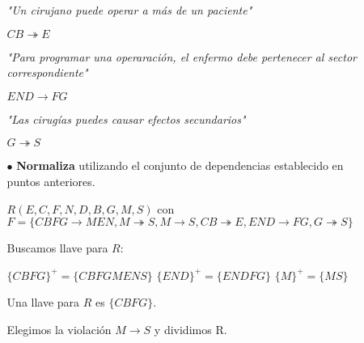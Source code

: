 \documentclass[12pt, letterpaper]{article}
\begin{document}
\begin{itemize}
\begin{itemize}
                                        \textit{"Un cirujano puede operar a más de un paciente"} \vspace{.2cm}

                                        $CB \twoheadrightarrow E$\vspace{.3cm}

                                        \textit{"Para programar una operaración, el enfermo debe pertenecer al sector correspondiente"}\vspace{.2cm}

                                        $END \rightarrow FG$\vspace{.3cm}

                                        \textit{"Las cirugías puedes causar efectos secundarios"}\vspace{.2cm}

                                        $G \twoheadrightarrow S$\vspace{.3cm}

                    \item[$\bullet$]    \textbf{Normaliza} utilizando el conjunto 
                                        de dependencias establecido en puntos 
                                        anteriores. \vspace{.3cm}
                                        
                                        $R(E,C,F,N,D,B,G,M,S)$ con \\ $F=\{CBFG \rightarrow MEN,M \twoheadrightarrow S,M\rightarrow S,CB \twoheadrightarrow E,END \rightarrow FG,G \twoheadrightarrow S\}$\vspace{.3cm}

                                        Buscamos llave para $R$:\vspace{.3cm}

                                        $\{CBFG\}^+=\{CBFGMENS\}$ \hspace{.5cm} $\{END\}^+=\{ENDFG\}$ \hspace{.5cm} $\{M\}^+=\{MS\}$\vspace{.2cm}

                                        Una llave para $R$ es $\{CBFG\}$.\vspace{.3cm}

                                        Elegimos la violación $M \rightarrow S$ y dividimos R.\vspace{.1cm}


\end{itemize}
\end{itemize}
\end{document}

